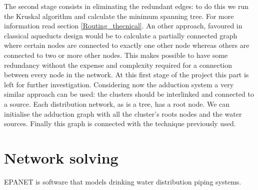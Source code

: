 The second stage consists in eliminating the redundant edges: to do this we run the Kruskal algorithm 
and calculate the minimum spanning tree. For more information read section \ref{Routing_thecnical}. 
An other approach, favoured in classical aqueducts design would be to calculate a partially connected 
graph where certain nodes are connected to exactly one other node whereas others are connected to two 
or more other nodes. This makes possible to have some redundancy without the expense and complexity 
required for a connection between every node in the network. At this first stage of the project this 
part is left for further investigation.
Considering now the adduction system a very similar approach can be used: the clusters should be 
interlinked and connected to a source. Each distribution network, as is a tree, has a root node. We 
can initialise the adduction graph with all the cluster's roots nodes and the water sources. Finally 
this graph is connected with the technique previously used.

\section{Network solving}
EPANET is software that models drinking water distribution piping systems.